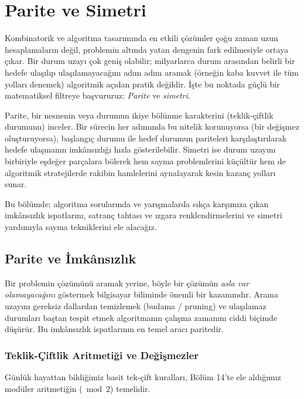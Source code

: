 \chapter[Parite ve Simetri · \textit{Temel}]{Parite ve Simetri}

Kombinatorik ve algoritma tasarımında en etkili çözümler çoğu zaman uzun hesaplamaların değil, problemin altında yatan dengenin fark edilmesiyle ortaya çıkar. Bir durum uzayı çok geniş olabilir; milyarlarca durum arasından belirli bir hedefe ulaşılıp ulaşılamayacağını adım adım aramak (örneğin kaba kuvvet ile tüm yolları denemek) algoritmik açıdan pratik değildir. İşte bu noktada güçlü bir matematiksel filtreye başvururuz: \emph{Parite} ve \emph{simetri}.

Parite, bir nesnenin veya durumun ikiye bölünme karakterini (teklik-çiftlik durumunu) inceler. Bir sürecin her adımında bu nitelik korunuyorsa (bir değişmez oluşturuyorsa), başlangıç durumu ile hedef durumun pariteleri karşılaştırılarak hedefe ulaşmanın imkânsızlığı hızla gösterilebilir. Simetri ise durum uzayını birbiriyle eşdeğer parçalara bölerek hem sayma problemlerini küçültür hem de algoritmik stratejilerde rakibin hamlelerini aynalayarak kesin kazanç yolları sunar.

Bu bölümde; algoritma sorularında ve yarışmalarda sıkça karşımıza çıkan imkânsızlık ispatlarını, satranç tahtası ve ızgara renklendirmelerini ve simetri yardımıyla sayma tekniklerini ele alacağız.

\section{Parite ve İmkânsızlık}

Bir problemin çözümünü aramak yerine, böyle bir çözümün \emph{asla var olamayacağını} göstermek bilgisayar biliminde önemli bir kazanımdır. Arama uzayını gereksiz dallardan temizlemek (budama / pruning) ve ulaşılamaz durumları baştan tespit etmek algoritmanın çalışma zamanını ciddi biçimde düşürür. Bu imkânsızlık ispatlarının en temel aracı paritedir.

\subsection{Teklik-Çiftlik Aritmetiği ve Değişmezler}

Günlük hayattan bildiğimiz basit tek-çift kuralları, Bölüm 14'te ele aldığımız modüler aritmetiğin ($\bmod 2$) temelidir.

